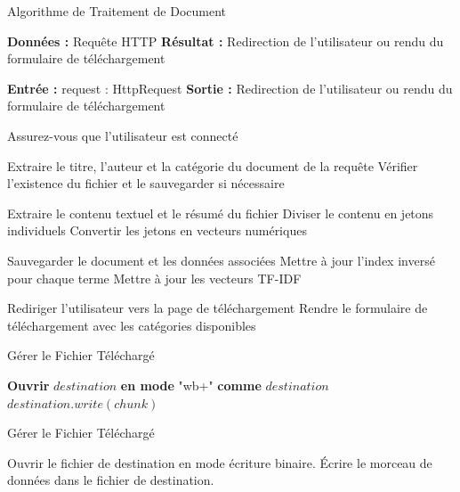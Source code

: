     \begin{algorithm}
    \caption{Algorithme de Traitement de Document}
    \begin{algorithmic}[1]
    \State \textbf{Données :} Requête HTTP
    \State \textbf{Résultat :} Redirection de l'utilisateur ou rendu du formulaire de téléchargement
    
    \State \textbf{Entrée :} request : HttpRequest
    \State \textbf{Sortie :} Redirection de l'utilisateur ou rendu du formulaire de téléchargement
    
    \State Assurez-vous que l'utilisateur est connecté
    
        \State Extraire le titre, l'auteur et la catégorie du document de la requête
        \State Vérifier l'existence du fichier et le sauvegarder si nécessaire
        
        \State Extraire le contenu textuel et le résumé du fichier
        \State Diviser le contenu en jetons individuels
        \State Convertir les jetons en vecteurs numériques
        
        \State Sauvegarder le document et les données associées
        \State Mettre à jour l'index inversé pour chaque terme
        \State Mettre à jour les vecteurs TF-IDF
        
        \State Rediriger l'utilisateur vers la page de téléchargement
    \Else
        \State Rendre le formulaire de téléchargement avec les catégories disponibles
    \EndIf
    \end{algorithmic}
    \end{algorithm}

    \begin{algorithm}
        \caption{Gérer le Fichier Téléchargé}
        \begin{algorithmic}[1]
            \State \textbf{Ouvrir} $destination$ \textbf{en mode} "wb+" \textbf{comme} $destination$
                \State $destination.write(chunk)$
            \EndFor
        \EndFunction
        \end{algorithmic}
    \end{algorithm}

    \begin{algorithm}
        \caption{Gérer le Fichier Téléchargé}
        \begin{algorithmic}[1]
            \State Ouvrir le fichier de destination en mode écriture binaire.
                \State Écrire le morceau de données dans le fichier de destination.
            \EndFor
        \EndProcedure
        \end{algorithmic}
    \end{algorithm}


